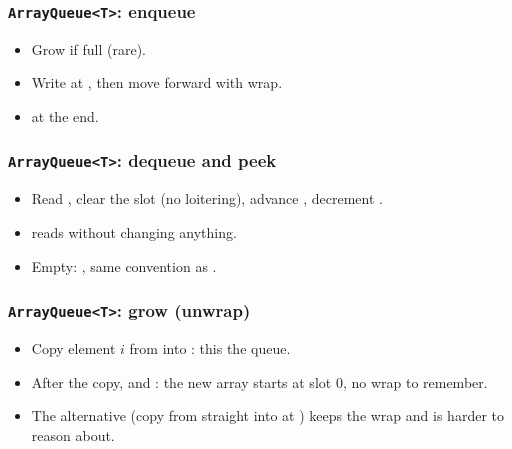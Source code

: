 \documentclass[aspectratio=169,10pt,compress]{beamer}
\begin{document}
\begin{frame}[t,fragile] \frametitle{\texttt{ArrayQueue<T>}: enqueue}
  \begin{itemize}\small
    \item Grow if full (rare).
    \item Write at , then move  forward
          with wrap.
    \item {} at the end.
  \end{itemize}
\end{frame}




\begin{frame}[t,fragile] \frametitle{\texttt{ArrayQueue<T>}: dequeue and peek}
  \begin{itemize}\small
    \item Read , clear the slot (no loitering), advance
          , decrement .
    \item {} reads without changing anything.
    \item Empty: , same convention as .
  \end{itemize}
\end{frame}




\begin{frame}[t,fragile] \frametitle{\texttt{ArrayQueue<T>}: grow (unwrap)}
  \begin{itemize}\small
    \item Copy element $i$ from  into :
          this  the queue.
    \item After the copy,  and : the new
          array starts at slot 0, no wrap to remember.
    \item The alternative (copy from  straight into  at
          ) keeps the wrap and is harder to reason about.
  \end{itemize}
\end{frame}
\end{document}
